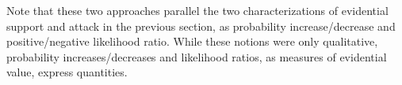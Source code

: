 \documentclass[10pt]{article}
\begin{document}
Note that these two approaches parallel the two characterizations of evidential support and attack in the previous 
section, as probability increase/decrease and positive/negative likelihood ratio. While these notions were only qualitative, 
probability increases/decreases and likelihood ratios, as measures of evidential value, express quantities.  

 
 
\end{document}
